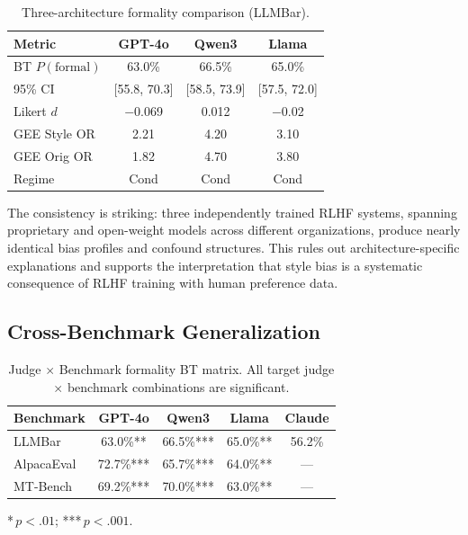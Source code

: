 \documentclass[11pt,twocolumn]{article}
\begin{document}
\begin{table}[t]
\centering
\small
\caption{Three-architecture formality comparison (LLMBar).}
\label{tab:form_arch}
\begin{tabular}{@{}lccc@{}}
\toprule
Metric & GPT-4o & Qwen3 & Llama \\
\midrule
BT $P(\text{formal})$ & 63.0\% & 66.5\% & 65.0\% \\
95\% CI & [55.8, 70.3] & [58.5, 73.9] & [57.5, 72.0] \\
Likert $d$ & $-$0.069 & 0.012 & $-$0.02 \\
GEE Style OR & 2.21 & 4.20 & 3.10 \\
GEE Orig OR & 1.82 & 4.70 & 3.80 \\
Regime & Cond & Cond & Cond \\
\bottomrule
\end{tabular}
\vspace{-2mm}
\end{table}

The consistency is striking: three independently trained RLHF systems, spanning proprietary and open-weight models across different organizations, produce nearly identical bias profiles and confound structures. This rules out architecture-specific explanations and supports the interpretation that style bias is a systematic consequence of RLHF training with human preference data.

\subsection{Cross-Benchmark Generalization}
\label{sec:benchmark}

\begin{table}[t]
\centering
\small
\caption{Judge $\times$ Benchmark formality BT matrix. All target judge $\times$ benchmark combinations are significant.}
\label{tab:benchmark}
\begin{tabular}{@{}lcccc@{}}
\toprule
Benchmark & GPT-4o & Qwen3 & Llama & Claude \\
\midrule
LLMBar & 63.0\%** & 66.5\%*** & 65.0\%** & 56.2\% \\
AlpacaEval & 72.7\%*** & 65.7\%*** & 64.0\%** & --- \\
MT-Bench & 69.2\%*** & 70.0\%*** & 63.0\%** & --- \\
\bottomrule
\end{tabular}

{\raggedright \scriptsize **\,$p{<}.01$; ***\,$p{<}.001$.\par}
\vspace{-3mm}
\end{table}
\end{document}
